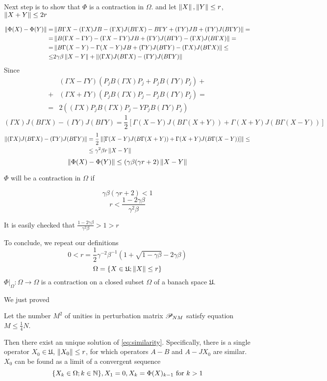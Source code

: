 \documentclass{article}
\begin{document}
Next step is to show that $\Phi$ is a contraction in $\Omega$.
and let $\left\|{X}\right\|, \left\|{Y}\right\| \leq r$, $\left\|{X+Y}\right\| \leq 2r$

\begin{align*}
    \left\|{\Phi(X) - \Phi(Y)}\right\|
    =& \left\|{B\Gamma X - (\Gamma X)JB - (\Gamma X)J(B\Gamma X) - B\Gamma Y + (\Gamma Y)JB + (\Gamma Y)J(B\Gamma Y)}\right\| = \\
    =& \left\|{B(\Gamma X - \Gamma Y) - (\Gamma X - \Gamma Y) JB + (\Gamma Y) J(B\Gamma Y) - (\Gamma X)J(B\Gamma X)}\right\| = \\
    =& \left\|{B\Gamma(X-Y) - \Gamma(X-Y)JB + (\Gamma Y) J(B\Gamma Y) - (\Gamma X)J(B\Gamma X)}\right\| \leq \\
    \leq& 2\gamma\beta\left\|{X-Y}\right\| + \left\|{(\Gamma X)J(B\Gamma X) - (\Gamma Y) J(B\Gamma Y)}\right\|
\end{align*}
Since 
\begin{align*}
    &(\Gamma X - \Gamma Y)(P_jB(\Gamma X)P_j + P_jB(\Gamma Y)P_j) + \\
    + &(\Gamma X + \Gamma Y)(P_jB(\Gamma X)P_j - P_jB(\Gamma Y)P_j) = \\
= &2((\Gamma X)P_jB(\Gamma X)P_j- YP_jB(\Gamma Y)P_j)\end{align*}
$$(\Gamma X)J(B\Gamma X) - (\Gamma Y) J(B\Gamma Y)
= \frac12\left[\Gamma(X-Y)J(B\Gamma(X+Y)) + \Gamma(X+Y)J(B\Gamma(X-Y))\right]$$
\begin{align*}
    \left\|{(\Gamma X)J(B\Gamma X) - (\Gamma Y) J(B\Gamma Y)}\right\|
    &= \frac12\left\|{\left[\Gamma(X-Y)J(B\Gamma(X+Y)) + \Gamma(X+Y)J(B\Gamma(X-Y))\right]}\right\|\leq \\
    &\leq \gamma^2\beta r \left\|{X-Y}\right\|
\end{align*}
$$\left\|{\Phi(X) - \Phi(Y)}\right\| \leq (\gamma\beta(\gamma r + 2)\left\|{X-Y}\right\|$$

$\Phi$ will be a contraction in $\Omega$ if

$$\gamma\beta(\gamma r + 2) < 1$$
$$r < \frac{1-2\gamma\beta}{\gamma^2\beta}$$

It is easily checked that $\frac{1-2\gamma\beta}{\gamma^2\beta}>1>r$

To conclude, we repeat our definitions
$$0< r = \frac12 \gamma^{-2} \beta^{-1} (1 + \sqrt{1-\gamma\beta} - 2\gamma\beta)$$
$$\Omega = \{X\in\mathfrak U; \left\|{X}\right\| \leq r\}$$
$\Phi|_{\Omega}:\Omega\to\Omega$ is a contraction on a closed subset $\Omega$ of a banach space $\mathfrak U$.

We just proved
\begin{thm}
    Let the number $M^2$ of unities in perturbation matrix $\mathscr{P}_{{N}{M}}$ satisfy equation $M \leq \frac14 N$.

    Then there exist an unique solution of \eqref{eq:similarity}.
    Specifically, there is a single operator $X_0\in\mathfrak U$, $\left\|{X_0}\right\| \leq r$,
    for which operators $A-B$ and $A-JX_0$ are similar.
    $X_0$ can be found as a limit of a convergent sequence
    $$\{X_k\in\Omega; k\in\mathbb{N}\}, X_1 = 0, X_k = \Phi(X)_{k-1} \text{ for } k>1$$
\end{thm}
\end{document}
